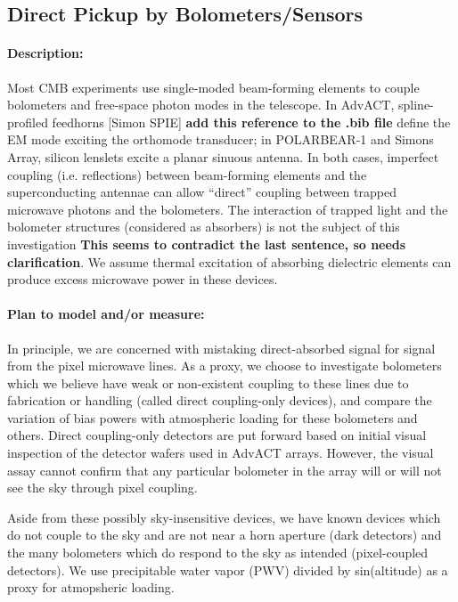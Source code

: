 \subsection{Direct Pickup by Bolometers/Sensors}

\paragraph{Description:}
Most CMB experiments use single-moded beam-forming elements to couple bolometers and free-space photon modes in the telescope. In AdvACT, spline-profiled feedhorns [Simon SPIE] \cite{Simon} \textbf{add this reference to the .bib file} define the EM mode exciting the orthomode transducer; in POLARBEAR-1 and Simons Array, silicon lenslets excite a planar sinuous antenna. In both cases, imperfect coupling (i.e. reflections) between beam-forming elements and the superconducting antennae can allow ``direct'' coupling between trapped microwave photons and the bolometers. The interaction of trapped light and the bolometer structures (considered as absorbers) is not the subject of this investigation \textbf{This seems to contradict the last sentence, so needs clarification}. We assume thermal excitation of absorbing dielectric elements can produce excess microwave power in these devices.

\paragraph{Plan to model and/or measure:}
In principle, we are concerned with mistaking direct-absorbed signal for signal from the pixel microwave lines. As a proxy, we choose to investigate bolometers which we believe have weak or non-existent coupling to these lines due to fabrication or handling (called direct coupling-only devices), and compare the variation of bias powers with atmospheric loading for these bolometers and others. Direct coupling-only detectors are put forward based on initial visual inspection of the detector wafers used in AdvACT arrays. However, the visual assay cannot confirm that any particular bolometer in the array will or will not see the sky through pixel coupling. 

Aside from these possibly sky-insensitive devices, we have known devices which do not couple to the sky and are not near a horn aperture (dark detectors) and the many bolometers which do respond to the sky as intended (pixel-coupled detectors). We use precipitable water vapor (PWV) divided by sin(altitude) as a proxy for atmopsheric loading.

